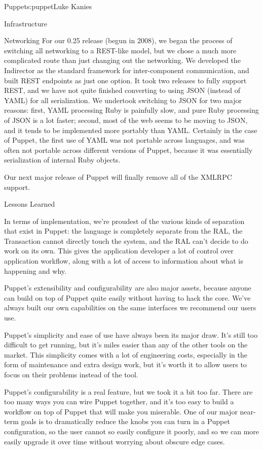 \begin{aosachapter}{Puppet}{s:puppet}{Luke Kanies}
\begin{aosasect1}{Infrastructure}
\begin{aosasect2}{Networking}
For our 0.25 release (begun in 2008), we began the process of
switching all networking to a REST-like model, but we chose a much more
complicated route than just changing out the networking.  We developed
the Indirector as the standard framework for inter-component
communication, and built REST endpoints as just one option.  It took
two releases to fully support REST, and we have not quite finished
converting to using JSON (instead of YAML) for all serialization.  We
undertook switching to JSON for two major reasons: first, YAML
processing Ruby is painfully slow, and pure Ruby processing of JSON is
a lot faster; second, most of the web seems to be moving to JSON, and
it tends to be implemented more portably than YAML.  Certainly in the
case of Puppet, the first use of YAML was not portable across
languages, and was often not portable across different versions of
Puppet, because it was essentially serialization of internal Ruby
objects.

Our next major release of Puppet will finally remove all of the XMLRPC
support.

\end{aosasect2}

\end{aosasect1}

\begin{aosasect1}{Lessons Learned}

In terms of implementation, we're proudest of the various kinds of
separation that exist in Puppet: the language is completely separate
from the RAL, the Transaction cannot directly touch the system, and
the RAL can't decide to do work on its own.  This gives the
application developer a lot of control over application workflow,
along with a lot of access to information about what is happening and
why.

Puppet's extensibility and configurability are also major assets,
because anyone can build on top of Puppet quite easily without having
to hack the core.  We've always built our own capabilities on the same
interfaces we recommend our users use.

Puppet's simplicity and ease of use have always been its major draw.
It's still too difficult to get running, but it's miles easier than
any of the other tools on the market.  This simplicity comes with a
lot of engineering costs, especially in the form of maintenance and
extra design work, but it's worth it to allow users to focus on their
problems instead of the tool.  

Puppet's configurability is a real
feature, but we took it a bit too far.  There are too many ways you
can wire Puppet together, and it's too easy to build a workflow on top
of Puppet that will make you miserable.  One of our major near-term
goals is to dramatically reduce the knobs you can turn in a Puppet
configuration, so the user cannot so easily configure it poorly, and
so we can more easily upgrade it over time without worrying about 
obscure edge cases.


\end{aosasect1}
\end{aosachapter}
